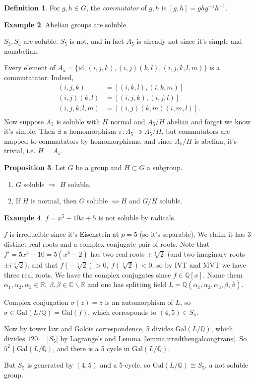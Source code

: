 \documentclass[a4paper]{article}
\newcommand{\Q}{\mathbb Q}
\newcommand{\C}{\mathbb C}
\newcommand{\R}{\mathbb R}
\newcommand{\gal}{\text{Gal}}
\newcommand{\id}{\text{id}}
\theoremstyle{definition}
\newtheorem{defn}{Definition}[subsection]
\newtheorem{prop}[defn]{Proposition}
\newtheorem{example}[defn]{Example}
\begin{document}
\begin{defn}
For $g,h\in G$, the \textit{commutator} of $g,h$ is $[g,h]=ghg^{-1}h^{-1}$.
\end{defn}

\begin{example}
Abelian groups are soluble.

$S_3, S_4$ are soluble. $S_5$ is not, and in fact $A_5$ is already not since it's simple and nonabelian.

Every element of $A_5=\{\id,(i,j,k),(i,j)(k,l),(i,j,k,l,m)\}$ is a commutatator. Indeed,
\[
\begin{aligned}
(i,j,k)&=[(i,k,l),(i,k,m)] \\
(i,j)(k,l)&=[(i,j,k),(i,j,l)] \\
(i,j,k,l,m)&=[(i,j)(k,m)(i,m,l)]. \\
\end{aligned}
\]
Now suppose $A_5$ is soluble with $H$ normal and $A_5/H$ abelian and forget we know it's simple. Then $\exists\text{ a homomorphism }\pi:A_5\twoheadrightarrow A_5/H$, but commutators are mapped to commutators by homomorphisms, and since $A_5/H$ is abelian, it's trivial, i.e. $H=A_5$.
\end{example}

\begin{prop}
Let $G$ be a group and $H\subset G$ a subgroup.
\begin{enumerate}
\item $G$ soluble $\Rightarrow$ $H$ soluble.
\item If $H$ is normal, then $G$ soluble $\Leftrightarrow H$ and $G/H$ soluble.
\end{enumerate}
\end{prop}

\begin{example}
$f=x^5-10x+5$ is not soluble by radicals.

$f$ is irreducible since it's Eisenstein at $p=5$ (so it's separable). We claim it has 3 distinct real roots and a complex conjugate pair of roots. Note that $f'=5x^4-10=5(x^4-2)$ has two real roots $\pm\sqrt[4]2$ (and two imaginary roots $\pm i\sqrt[4]2$), and that $f(-\sqrt[4]2)>0,\ f(\sqrt[4]2)<0$, so by IVT and MVT we have three real roots. We have the complex conjugates since $f\in\Q[x]$. Name them $\alpha_1,\alpha_2,\alpha_3\in\R,\ \beta,\overline\beta\in\C\backslash\R$ and one has splitting field $L=\Q(\alpha_1,\alpha_2,\alpha_3,\beta,\overline\beta)$.

Complex conjugation $\sigma(z)=\overline z$ is an automorphism of $L$, so $\sigma\in\gal(L/\Q)=\gal(f)$, which corresponds to $(4,5)\in S_5$.

Now by tower law and Galois correspondence, 5 divides $\gal(L/\Q)$, which divides $120=|S_5|$ by Lagrange's and Lemma \ref{lemma:irredthengalcongtrans}. So $5^2\nmid\gal(L/\Q)$, and there is a 5 cycle in $\gal(L/\Q)$.

But $S_5$ is generated by $(4,5)$ and a 5-cycle, so $\gal(L/\Q)\cong S_5$, a not soluble group.
\end{example}
\end{document}

